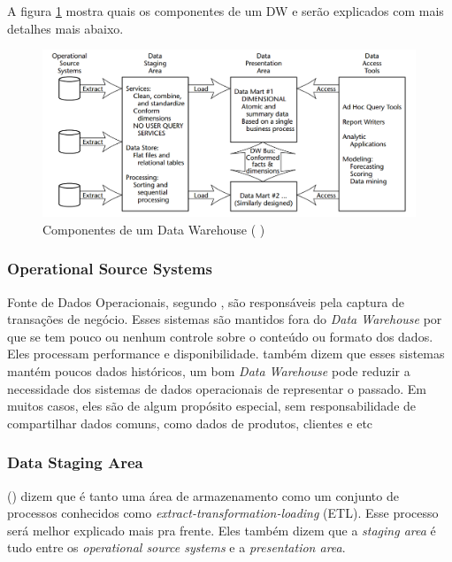 A figura \ref{dwComponents} mostra quais os componentes de um DW e serão explicados com mais detalhes mais abaixo.
\begin{figure}[H]
\centering
\includegraphics[height=5cm]{imagens/componentes_DW.png}
\caption{Componentes de um Data Warehouse (\citeauthor{kimball2002} \citeyear{kimball2002})}
\label{dwComponents}
\end{figure}

\subsubsection{Operational Source Systems}
Fonte de Dados Operacionais, segundo , são responsáveis pela captura de transações de negócio. Esses sistemas são mantidos fora do \textit{Data Warehouse} por que se tem pouco ou nenhum controle sobre o conteúdo ou formato dos dados. Eles processam performance e disponibilidade.  também dizem que esses sistemas mantém poucos dados históricos, um bom \textit{Data Warehouse} pode reduzir a necessidade dos sistemas de dados operacionais de representar o passado. Em muitos casos, eles são de algum propósito especial, sem responsabilidade de compartilhar dados comuns, como dados de produtos, clientes e etc 

\subsubsection{Data Staging Area}
\citeauthor{kimball2002} (\citeyear{kimball2002}) dizem que é tanto uma área de armazenamento como um conjunto de processos conhecidos como \textit{extract-transformation-loading} (ETL). Esse processo será melhor explicado mais pra frente. Eles também dizem que a \textit{staging area} é tudo entre os \textit{operational source systems} e a \textit{presentation area}. 

